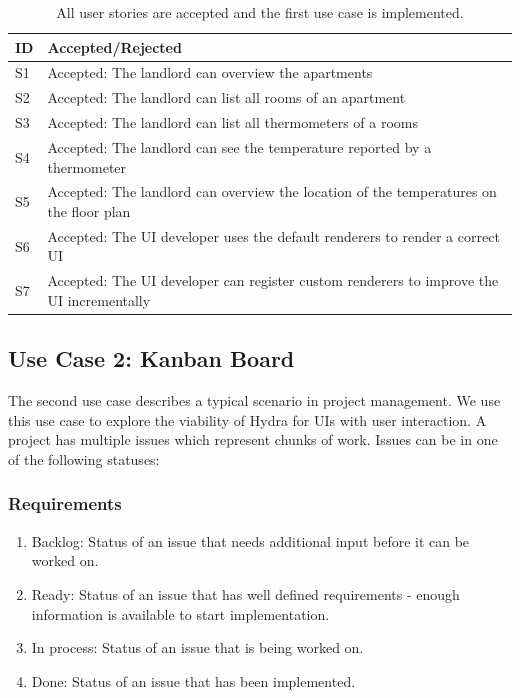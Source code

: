 \begin{table}
  \begin{center}
    \begin{tabular}{ |l|l| }
      \hline
      \textbf{ID} & \textbf{Accepted/Rejected} \\
      \hline
      S1 & Accepted: The landlord can overview the apartments \\
      \hline
      S2 & Accepted: The landlord can list all rooms of an apartment \\
      \hline
      S3 & Accepted: The landlord can list all thermometers of a rooms \\
      \hline
      S4 & Accepted: The landlord can see the temperature reported by a thermometer \\
      \hline
      S5 & Accepted: The landlord can overview the location of the temperatures on the floor plan \\
      \hline
      S6 & Accepted: The UI developer uses the default renderers to render a correct UI \\
      \hline
      S7 & Accepted: The UI developer can register custom renderers to improve the UI incrementally \\
      \hline
    \end{tabular}
    \caption{All user stories are accepted and the first use case is implemented.}
  \end{center}
\end{table}

\subsection{Use Case 2: Kanban Board}
The second use case describes a typical scenario in project management. We use this use case to explore the viability of Hydra for UIs with user interaction. A project has multiple issues which represent chunks of work. Issues can be in one of the following statuses:

\subsubsection{Requirements}

\begin{enumerate}
  \item Backlog: Status of an issue that needs additional input before it can be worked on.
  \item Ready: Status of an issue that has well defined requirements - enough information is available to start implementation.
  \item In process: Status of an issue that is being worked on.
  \item Done: Status of an issue that has been implemented.
\end{enumerate}

